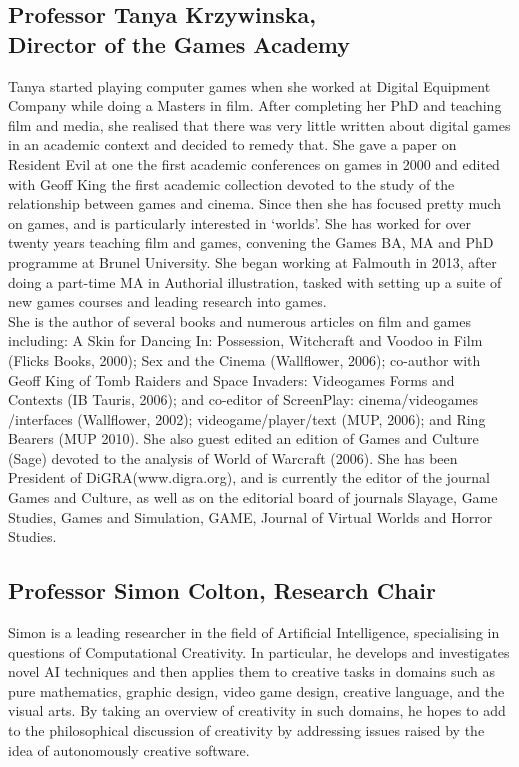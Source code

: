 \subsection[Tanya Krzywinska]{Professor Tanya Krzywinska,\\ Director of the Games Academy}

Tanya started playing computer games when she worked at Digital Equipment Company while doing a Masters in film.  After completing her PhD and teaching film and media, she realised that there was very little written about digital games in an academic context and decided to remedy that.  She gave a paper on Resident Evil at one the first academic conferences on games in 2000 and edited with Geoff King the first academic collection devoted to the study of the relationship between games and cinema. Since then she has focused pretty much on games, and is particularly interested in ‘worlds’. She has worked for over twenty years teaching film and games, convening the Games BA, MA and PhD programme at Brunel University. She began working at Falmouth in 2013, after doing a part-time MA in Authorial illustration, tasked with setting up a suite of new games courses and leading research into games. \\

She is the author of several books and numerous articles on film and games including: A Skin for Dancing In: Possession, Witchcraft and Voodoo in Film (Flicks Books, 2000); Sex and the Cinema (Wallflower, 2006); co-author with Geoff King of Tomb Raiders and Space Invaders: Videogames Forms and Contexts (IB Tauris, 2006); and co-editor of ScreenPlay: cinema/videogames /interfaces (Wallflower, 2002); videogame/player/text (MUP, 2006); and Ring Bearers (MUP 2010). She also guest edited an edition of Games and Culture (Sage) devoted to the analysis of World of Warcraft (2006). She has been President of DiGRA(www.digra.org), and is currently the editor of the journal Games and Culture, as well as on the editorial board of journals Slayage, Game Studies, Games and Simulation, GAME, Journal of Virtual Worlds and Horror Studies. \\

\subsection[Simon Colton]{Professor Simon Colton,  Research Chair}

Simon is a leading researcher in the field of Artificial Intelligence, specialising in questions of Computational Creativity. In particular, he develops and investigates novel AI techniques and then applies them to creative tasks in domains such as pure mathematics, graphic design, video game design, creative language, and the visual arts. By taking an overview of creativity in such domains, he hopes to add to the philosophical discussion of creativity by addressing issues raised by the idea of autonomously creative software. 

